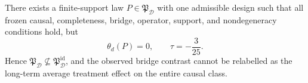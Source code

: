 There exists a finite-support law \(P\in\mathfrak P_{\mathcal D}\) with one admissible design such that all frozen causal, completeness, bridge, operator, support, and nondegeneracy conditions hold, but
\[
 \theta_d(P)=0,
 \qquad
 \tau=-\frac3{25}.
\]
Hence \(\mathfrak P_{\mathcal D}\not\subseteq\mathfrak P_{\mathcal D}^{\mathrm{id}}\), and the observed bridge contrast cannot be relabelled as the long-term average treatment effect on the entire causal class.